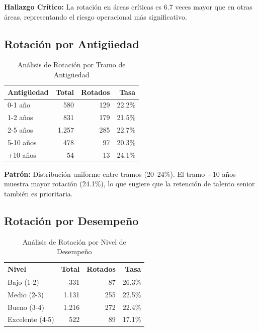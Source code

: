 \documentclass[11pt,a4paper,twoside]{article}
\begin{document}
\textbf{Hallazgo Crítico:} La rotación en áreas críticas es 6.7 veces mayor que en otras áreas, representando el riesgo operacional más significativo.

\subsection{Rotación por Antigüedad}

\begin{table}[H]
    \centering
    \caption{Análisis de Rotación por Tramo de Antigüedad}
    \begin{tabular}{|l|r|r|r|}
        \toprule
        \textbf{Antigüedad} & \textbf{Total} & \textbf{Rotados} & \textbf{Tasa} \\
        \midrule
        0-1 año & 580 & 129 & 22.2\% \\
        1-2 años & 831 & 179 & 21.5\% \\
        2-5 años & 1.257 & 285 & 22.7\% \\
        5-10 años & 478 & 97 & 20.3\% \\
        +10 años & 54 & 13 & 24.1\% \\
        \bottomrule
    \end{tabular}
\end{table}

\textbf{Patrón:} Distribución uniforme entre tramos (20--24\%). El tramo +10 años muestra mayor rotación (24.1\%), lo que sugiere que la retención de talento senior también es prioritaria.

\subsection{Rotación por Desempeño}

\begin{table}[H]
    \centering
    \caption{Análisis de Rotación por Nivel de Desempeño}
    \begin{tabular}{|l|r|r|r|}
        \toprule
        \textbf{Nivel} & \textbf{Total} & \textbf{Rotados} & \textbf{Tasa} \\
        \midrule
        Bajo (1-2) & 331 & 87 & 26.3\% \\
        Medio (2-3) & 1.131 & 255 & 22.5\% \\
        Bueno (3-4) & 1.216 & 272 & 22.4\% \\
        Excelente (4-5) & 522 & 89 & 17.1\% \\
        \bottomrule
    \end{tabular}
\end{table}
\end{document}
